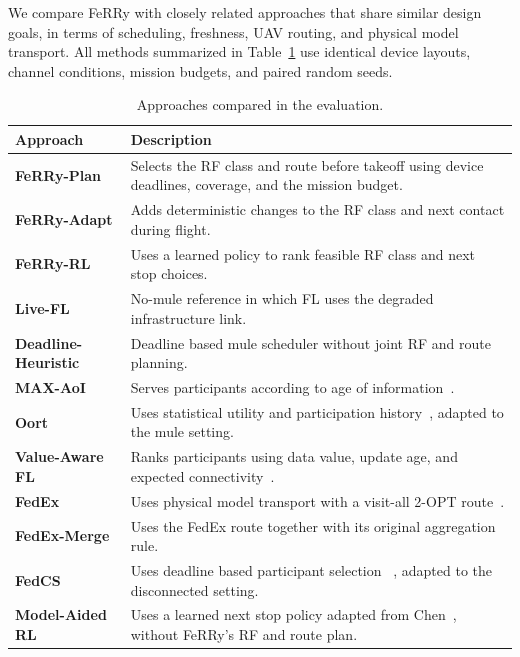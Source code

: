 \documentclass[conference]{IEEEtran}
\newcommand{\sysname}{FeRRy}
\begin{document}
We compare \sysname{} with closely related approaches that share similar design goals, in terms of scheduling, freshness, UAV routing, and physical
model transport. All methods summarized in Table~\ref{tab:arms} use identical device layouts, channel conditions,
mission budgets, and paired random seeds.


\begin{table}[t]
\centering
\caption{Approaches compared in the evaluation.}
\label{tab:arms}
\small
\begin{tabular}{p{} p{}}
\hline
\textbf{Approach} & \textbf{Description} \\
\hline

\textbf{\sysname{}-Plan} &
Selects the RF class and route before takeoff using device deadlines, coverage,
and the mission budget. \\

\textbf{\sysname{}-Adapt} &
Adds deterministic changes to the RF class and next contact during flight. \\

\textbf{\sysname{}-RL} &
Uses a learned policy to rank feasible RF class and next stop choices. \\

\textbf{Live-FL} &
No-mule reference in which FL uses the degraded infrastructure link. \\

\textbf{Deadline-Heuristic} &
Deadline based mule scheduler without joint RF and route planning. \\

\textbf{MAX-AoI} &
Serves participants according to age of information~\cite{kadota2018scheduling}. \\

\textbf{Oort} &
Uses statistical utility and participation history~\cite{lai2021oort},
adapted to the mule setting. \\

\textbf{Value-Aware FL} &
Ranks participants using data value, update age, and expected
connectivity~\cite{cui2023data}. \\

\textbf{FedEx} &
Uses physical model transport with a visit-all 2-OPT
route~\cite{bian2025indirect}. \\

\textbf{FedEx-Merge} &
Uses the FedEx route together with its original aggregation rule. \\

\textbf{FedCS} &
Uses deadline based participant selection ~\cite{nishio2019client}, adapted to the disconnected setting. \\

\textbf{Model-Aided RL} &
Uses a learned next stop policy adapted from
Chen~\cite{chen2023model}, without \sysname{}'s RF and route plan. \\

\hline
\end{tabular}
\end{table}
\end{document}
